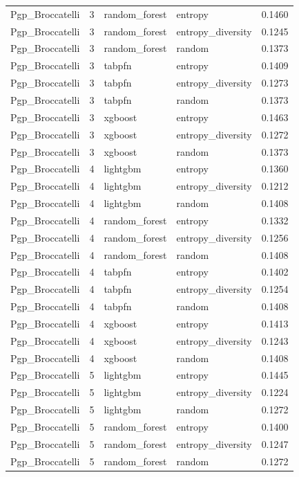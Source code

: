 \begin{tabular}{lrllr}
Pgp_Broccatelli & 3 & random_forest & entropy & 0.1460 \\
Pgp_Broccatelli & 3 & random_forest & entropy_diversity & 0.1245 \\
Pgp_Broccatelli & 3 & random_forest & random & 0.1373 \\
Pgp_Broccatelli & 3 & tabpfn & entropy & 0.1409 \\
Pgp_Broccatelli & 3 & tabpfn & entropy_diversity & 0.1273 \\
Pgp_Broccatelli & 3 & tabpfn & random & 0.1373 \\
Pgp_Broccatelli & 3 & xgboost & entropy & 0.1463 \\
Pgp_Broccatelli & 3 & xgboost & entropy_diversity & 0.1272 \\
Pgp_Broccatelli & 3 & xgboost & random & 0.1373 \\
Pgp_Broccatelli & 4 & lightgbm & entropy & 0.1360 \\
Pgp_Broccatelli & 4 & lightgbm & entropy_diversity & 0.1212 \\
Pgp_Broccatelli & 4 & lightgbm & random & 0.1408 \\
Pgp_Broccatelli & 4 & random_forest & entropy & 0.1332 \\
Pgp_Broccatelli & 4 & random_forest & entropy_diversity & 0.1256 \\
Pgp_Broccatelli & 4 & random_forest & random & 0.1408 \\
Pgp_Broccatelli & 4 & tabpfn & entropy & 0.1402 \\
Pgp_Broccatelli & 4 & tabpfn & entropy_diversity & 0.1254 \\
Pgp_Broccatelli & 4 & tabpfn & random & 0.1408 \\
Pgp_Broccatelli & 4 & xgboost & entropy & 0.1413 \\
Pgp_Broccatelli & 4 & xgboost & entropy_diversity & 0.1243 \\
Pgp_Broccatelli & 4 & xgboost & random & 0.1408 \\
Pgp_Broccatelli & 5 & lightgbm & entropy & 0.1445 \\
Pgp_Broccatelli & 5 & lightgbm & entropy_diversity & 0.1224 \\
Pgp_Broccatelli & 5 & lightgbm & random & 0.1272 \\
Pgp_Broccatelli & 5 & random_forest & entropy & 0.1400 \\
Pgp_Broccatelli & 5 & random_forest & entropy_diversity & 0.1247 \\
Pgp_Broccatelli & 5 & random_forest & random & 0.1272 \\

\end{tabular}
